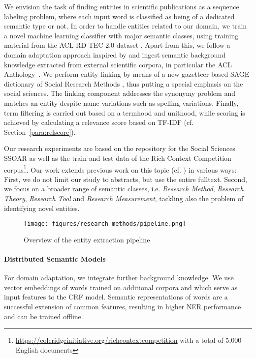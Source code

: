 We envision the task of finding entities in scientific publications as a sequence labeling problem, 
where each input word is classified as being of a dedicated semantic type or not.
In order to handle entities related to our domain, we train a novel machine learning classifier with major semantic classes,
using training material from the ACL RD-TEC 2.0 dataset  \cite{qasemizadeh2016acl}.
Apart from this, we follow a domain adaptation approach inspired by \cite{agerri2016robust} and ingest semantic background knowledge extracted from external scientific corpora, in particular the ACL Anthology~\cite{bird2008acl,gildea2018acl}.
We perform entity linking by means of a new gazetteer-based SAGE dictionary  of Social Research Methods  \cite{lewis2003sage}, thus putting a special emphasis on the social sciences. The linking component addresses the synonymy problem and matches an entity despite name variations such as spelling variations. 
Finally, term filtering is carried out based on a termhood and unithood, while scoring is achieved by calculating a relevance score based on TF-IDF (cf.  Section~\ref{para:relscore}).

Our research experiments are based on the repository for the Social Sciences SSOAR as well as the train and test data of the Rich Context Competition corpus\footnote{\url{https://coleridgeinitiative.org/richcontextcompetition}
with a total of 5,000 English documents}.
Our work extends previous work on this topic (cf. \cite{eckle2013automatically}) in various ways: First, we do not limit our study to abstracts, but use the entire fulltext. Second, we focus on a broader range of semantic classes, 
i.e. \textit{Research Method}, \textit{Research Theory}, \textit{Research Tool} and \textit{Research Measurement}, tackling also the problem of identifying novel entities.
 


\begin{figure}[t]
\centering
    \texttt{[image: figures/research-methods/pipeline.png]}
    \caption{Overview of the entity extraction pipeline}
\label{fig:pipeline}
\end{figure}


\paragraph{Distributed Semantic Models}%
\label{subsec:dist-model}
For domain adaptation, we integrate further background knowledge. We use vector embeddings  of words trained on additional corpora and which serve as input features to the CRF model. Semantic representations of words are a successful extension of common features, resulting in higher NER performance~\cite{Turian} and can be trained offline.


